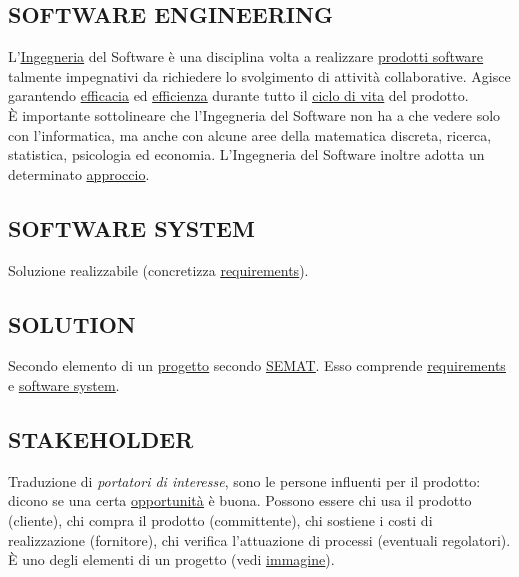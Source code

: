 		\subsection{SOFTWARE ENGINEERING}  \label{swe}
		 L'\underline{\hyperref[engineering]{Ingegneria}} del Software è una disciplina volta a realizzare  \underline{\hyperref[prodotto]{prodotti software}} talmente impegnativi da richiedere lo svolgimento di attività collaborative. Agisce garantendo \underline{\hyperref[efficacia]{efficacia}} ed \underline{\hyperref[efficienza]{efficienza}} durante tutto il \underline{\hyperref[ciclo]{ciclo di vita}} del prodotto. \\
		 È importante sottolineare che l'Ingegneria del Software non ha a che vedere solo con l'informatica, ma anche con alcune aree della matematica discreta, ricerca, statistica, psicologia ed economia. L'Ingegneria del Software inoltre adotta un determinato \underline{\hyperref[approccio]{approccio}}.


		\subsection{SOFTWARE SYSTEM}  \label{sistemasoftware}
		Soluzione realizzabile (concretizza \underline{\hyperref[requirements]{requirements}}).


		\subsection{SOLUTION}  \label{solution}
		Secondo elemento di un \underline{\hyperref[progetto]{progetto}} secondo \underline{\hyperref[semat]{SEMAT}}. Esso comprende \underline{\hyperref[requirements]{requirements}} e
		 \underline{\hyperref[sistemasoftware]{software system}}.

		\subsection{STAKEHOLDER}  \label{stakeholder}
		Traduzione di \textit{portatori di interesse}, sono le persone influenti per il prodotto: dicono se una certa \underline{\hyperref[opportunity]{opportunità}} è buona.
		Possono essere chi usa il prodotto (cliente), chi compra il prodotto (committente), chi sostiene i costi di realizzazione (fornitore), chi verifica l'attuazione di processi (eventuali regolatori). \\
		È uno degli elementi di un progetto (vedi \underline{\hyperref[customerimage]{immagine}}).

